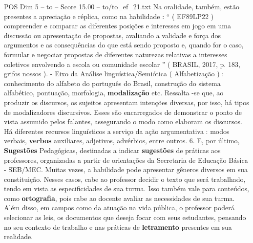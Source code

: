 \begin{textsample}{POS Dim 5 – to – Score 15.00 – to/to\_ef\_21.txt}
Na oralidade, também, estão presentes a apreciação e réplica, como na habilidade : “ ( EF89LP22 ) compreender e comparar as diferentes posições e interesses em jogo em uma discussão ou apresentação de propostas, avaliando a validade e força dos argumentos e as consequências do que está sendo proposto e, quando for o caso, formular e negociar propostas de diferentes naturezas relativas a interesses coletivos envolvendo a escola ou comunidade escolar ” ( BRASIL, 2017, p. 183, grifos nossos ). - Eixo da Análise linguística/Semiótica ( Alfabetização ) : conhecimento do alfabeto do português do Brasil, construção do sistema alfabético, pontuação, morfologia, \textbf{modalização} etc.
Ressalta -se que, ao produzir os discursos, os sujeitos apresentam intenções diversas, por isso, há tipos de modalizadores discursivos.
Esses são encarregados de demonstrar o ponto de vista assumido pelos falantes, assegurando o modo como elaboram os discursos.
Há diferentes recursos linguísticos a serviço da ação argumentativa : modos verbais, \textbf{verbos} auxiliares, adjetivos, advérbios, entre outros. 6.
E, por último, \textbf{Sugestões} Pedagógicas, destinadas a indicar \textbf{sugestões} de práticas aos professores, organizadas a partir de orientações da Secretaria de Educação Básica - SEB/MEC.
Muitas vezes, a habilidade pode apresentar gêneros diversos em sua constituição.
Nesses casos, cabe ao professor decidir o texto que será trabalhado, tendo em vista as especificidades de sua turma.
Isso também vale para conteúdos, como \textbf{ortografia}, pois cabe ao docente avaliar as necessidades de sua turma.
Além disso, em campos como da atuação na vida pública, o professor poderá selecionar as leis, os documentos que deseja focar com seus estudantes, pensando no seu contexto de trabalho e nas práticas de \textbf{letramento} presentes em sua realidade.

\end{textsample}
